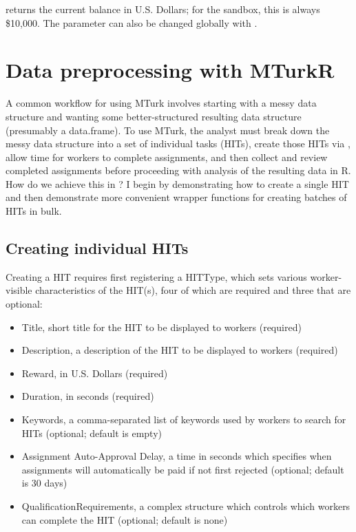 \noindent {} returns the current balance in U.S. Dollars; for the sandbox, this is always \$10,000. The  parameter can also be changed globally with . 


\section{Data preprocessing with MTurkR}

A common workflow for using MTurk involves starting with a messy data structure and wanting some better-structured resulting data structure (presumably a data.frame). To use MTurk, the analyst must break down the messy data structure into a set of individual tasks (HITs), create those HITs via , allow time for workers to complete assignments, and then collect and review completed assignments before proceeding with analysis of the resulting data in R. How do we achieve this in ? I begin by demonstrating how to create a single HIT and then demonstrate more convenient wrapper functions for creating batches of HITs in bulk.

\subsection{Creating individual HITs}
Creating a HIT requires first registering a HITType, which sets various worker-visible characteristics of the HIT(s), four of which are required and three that are optional:

\begin{itemize}
\item Title, short title for the HIT to be displayed to workers (required)
\item Description, a description of the HIT to be displayed to workers (required)
\item Reward, in U.S. Dollars (required)
\item Duration, in seconds (required)
\item Keywords, a comma-separated list of keywords used by workers to search for HITs (optional; default is empty)
\item Assignment Auto-Approval Delay, a time in seconds which specifies when assignments will automatically be paid if not first rejected (optional; default is 30 days)
\item QualificationRequirements, a complex structure which controls which workers can complete the HIT (optional; default is none)
\end{itemize}

